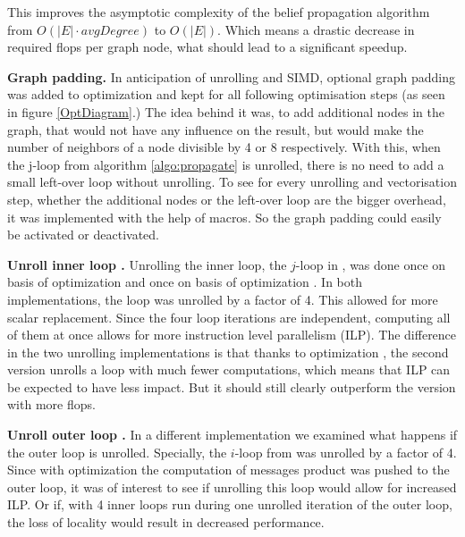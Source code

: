 \documentclass[letterpaper]{article}
\let\cref=\Cref %
\newcommand{\mypar}[1]{{\bf #1.}}
\begin{document}
This improves the asymptotic complexity of the belief propagation algorithm from $O(|E|\cdot avgDegree)$ to $O(|E|)$. Which means a drastic decrease in required flops per graph node, what should lead to a significant speedup.

\mypar{Graph padding}
In anticipation of unrolling and SIMD, optional graph padding was added to optimization  and kept for all following optimisation steps (as seen in figure \ref{OptDiagram}.) The idea behind it was, to add additional nodes in the graph, that would not have any influence on the result, but would make the number of neighbors of a node divisible by 4 or 8 respectively. With this, when the j-loop from algorithm \ref{algo:propagate} is unrolled, there is no need to add a small left-over loop without unrolling. To see for every unrolling and vectorisation step, whether the additional nodes or the left-over loop are the bigger overhead, it was implemented with the help of macros. So the graph padding could easily be activated or deactivated.


\mypar{Unroll inner loop }
Unrolling the inner loop, the $j$-loop in \cref{algo:propagate}, was done once on basis of optimization  and once on basis of optimization . In both implementations, the loop was unrolled by a factor of 4. This allowed for more scalar replacement. Since the four loop iterations are independent, computing all of them at once allows for more instruction level parallelism (ILP).
The difference in the two unrolling implementations is that thanks to optimization , the second version unrolls a loop with much fewer computations, which means that ILP can be expected to have less impact. But it should still clearly outperform the version with more flops.


\mypar{Unroll outer loop }
In a different implementation we examined what happens if the outer loop is unrolled. Specially, the $i$-loop from \cref{algo:propagate} was unrolled by a factor of 4. Since with optimization  the computation of messages product was pushed to the outer loop, it was of interest to see if unrolling this loop would allow for increased ILP. Or if, with 4 inner loops run during one unrolled iteration of the outer loop, the loss of locality would result in decreased performance. 
\end{document}
